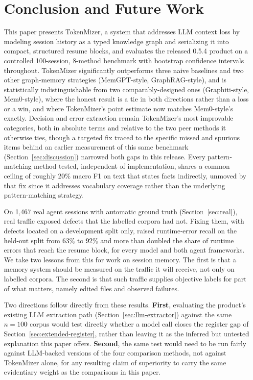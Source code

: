 \documentclass[journal]{IEEEtran}
\begin{document}
\section{Conclusion and Future Work}
\label{sec:conclusion}

This paper presents TokenMizer, a system that addresses LLM
context loss by modeling session history as a typed knowledge
graph and serializing it into compact, structured resume
blocks, and evaluates the released 0.5.4 product on a
controlled 100-session, 8-method benchmark with bootstrap
confidence intervals throughout.
TokenMizer significantly outperforms three naive baselines and
two other graph-memory strategies (MemGPT-style,
GraphRAG-style), and is statistically indistinguishable from
two comparably-designed ones (Graphiti-style, Mem0-style),
where the honest result is a tie in both directions rather than
a loss or a win, and where TokenMizer's point estimate now
matches Mem0-style's exactly.
Decision and error extraction remain TokenMizer's most
improvable categories, both in absolute terms and relative to
the two peer methods it otherwise ties, though a targeted fix
traced to the specific missed and spurious items behind an
earlier measurement of this same benchmark (Section~\ref{sec:discussion})
narrowed both gaps in this release. Every pattern-matching
method tested, independent of implementation, shares a common
ceiling of roughly 20\% macro F1 on text that states facts
indirectly, unmoved by that fix since it addresses vocabulary
coverage rather than the underlying pattern-matching strategy.

On 1{,}467 real agent sessions with automatic ground truth
(Section~\ref{sec:real}), real traffic exposed defects that the
labelled corpora had not. Fixing them, with defects located on a
development split only, raised runtime-error recall on the
held-out split from $63\%$ to $92\%$ and more than doubled the share of
runtime errors that reach the resume block, for every model and
both agent frameworks. We take two lessons from this for work on
session memory. The first is that a memory system should be
measured on the traffic it will receive, not only on labelled
corpora. The second is that such traffic supplies objective
labels for part of what matters, namely edited files and
observed failures.

Two directions follow directly from these results.
\textbf{First}, evaluating the product's existing LLM
extraction path (Section~\ref{sec:llm-extractor}) against the
same $n=100$ corpus would test directly whether a model call
closes the register gap of Section~\ref{sec:extended-register},
rather than leaving it as the inferred but untested explanation
this paper offers.
\textbf{Second}, the same test would need to be run fairly
against LLM-backed versions of the four comparison methods, not
against TokenMizer alone, for any resulting claim of superiority
to carry the same evidentiary weight as the comparisons in this
paper.
\end{document}
